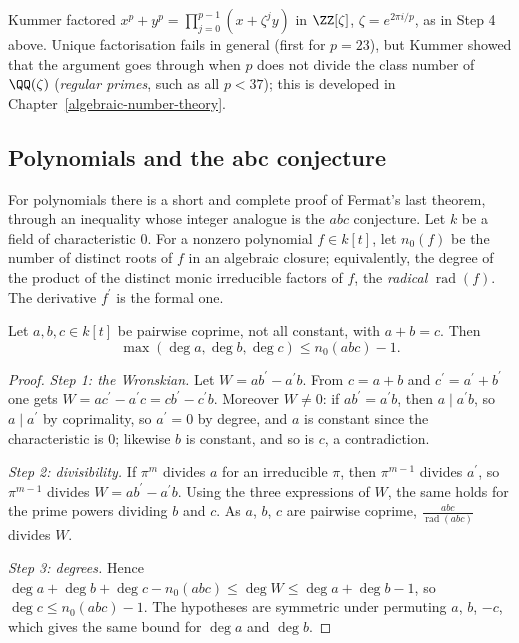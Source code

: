 \begin{remark}\label{diophantine-equations:remark-kummer}
Kummer factored $x^p + y^p = \prod_{j=0}^{p-1}(x + \zeta^jy)$ in $\ZZ[\zeta]$, $\zeta = e^{2\pi i/p}$, as in Step 4 above. Unique factorisation fails in general (first for $p = 23$), but Kummer showed that the
argument goes through when $p$ does not divide the class number of $\QQ(\zeta)$ (\emph{regular primes}, such as all $p < 37$); this is developed in Chapter~\ref{algebraic-number-theory}.
\end{remark}

\subsection{Polynomials and the abc conjecture}\label{diophantine-equations:subsection-abc}

For polynomials there is a short and complete proof of Fermat's last theorem, through an inequality whose integer analogue is the $abc$ conjecture. Let $k$ be a field of characteristic $0$. For a nonzero
polynomial $f \in k[t]$, let $n_0(f)$ be the number of distinct roots of $f$ in an algebraic closure; equivalently, the degree of the product of the distinct monic irreducible factors of $f$, the \emph{radical}
$\operatorname{rad}(f)$. The derivative $f^{\prime}$ is the formal one.

\begin{theorem}\label{diophantine-equations:theorem-mason-stothers}
Let $a, b, c \in k[t]$ be pairwise coprime, not all constant, with $a + b = c$. Then
\[
\max(\deg a, \deg b, \deg c) \leq n_0(abc) - 1.
\]
\end{theorem}

\begin{proof}
\emph{Step 1: the Wronskian.} Let $W = ab^{\prime} - a^{\prime}b$. From $c = a + b$ and $c^{\prime} = a^{\prime} + b^{\prime}$ one gets $W = ac^{\prime} - a^{\prime}c = cb^{\prime} - c^{\prime}b$. Moreover $W \neq 0$:
if $ab^{\prime} = a^{\prime}b$, then $a \mid a^{\prime}b$, so $a \mid a^{\prime}$ by coprimality, so $a^{\prime} = 0$ by degree, and $a$ is constant since the characteristic is $0$; likewise $b$ is constant, and
so is $c$, a contradiction.

\emph{Step 2: divisibility.} If $\pi^m$ divides $a$ for an irreducible $\pi$, then $\pi^{m-1}$ divides $a^{\prime}$, so $\pi^{m - 1}$ divides $W = ab^{\prime} - a^{\prime}b$. Using the three expressions of $W$,
the same holds for the prime powers dividing $b$ and $c$. As $a$, $b$, $c$ are pairwise coprime, $\frac{abc}{\operatorname{rad}(abc)}$ divides $W$.

\emph{Step 3: degrees.} Hence $\deg a + \deg b + \deg c - n_0(abc) \leq \deg W \leq \deg a + \deg b - 1$, so $\deg c \leq n_0(abc) - 1$. The hypotheses are symmetric under permuting $a$, $b$, $-c$, which gives the
same bound for $\deg a$ and $\deg b$.
\end{proof}

